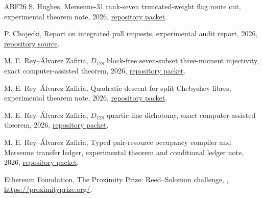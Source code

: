 \documentclass[11pt,a4paper]{amsart}
\numberwithin{equation}{section}
\theoremstyle{remark}
\begin{document}
\begin{thebibliography}{ABF26}
S. Hughes,
\newblock Mersenne-31 rank-seven truncated-weight flag route cut,
\newblock experimental theorem note, 2026,
\newblock \href{https://github.com/przchojecki/rs-mca/blob/5ecb9ab538a0a57dcb81018b17f32849049fb998/experimental/notes/thresholds/m31_rank7_truncated_weight_flag_route_cut_v1.md}{repository packet}.

P. Chojecki,
\newblock Report on integrated pull requests,
\newblock experimental audit report, 2026,
\newblock \href{https://github.com/przchojecki/rs-mca/blob/5ecb9ab538a0a57dcb81018b17f32849049fb998/experimental/PR-report-1.tex}{repository source}.

M. E. Rey--\'Alvarez Zafiria,
\newblock $D_{128}$ block-free seven-subset three-moment injectivity,
\newblock exact computer-assisted theorem, 2026,
\newblock \href{https://github.com/przchojecki/rs-mca/pull/1015}{repository packet}.

M. E. Rey--\'Alvarez Zafiria,
\newblock Quadratic descent for split Chebyshev fibres,
\newblock experimental theorem note, 2026,
\newblock \href{https://github.com/przchojecki/rs-mca/pull/1016}{repository packet}.

M. E. Rey--\'Alvarez Zafiria,
\newblock $D_{128}$ quartic-line dichotomy,
\newblock exact computer-assisted theorem, 2026,
\newblock \href{https://github.com/przchojecki/rs-mca/pull/1017}{repository packet}.

M. E. Rey--\'Alvarez Zafiria,
\newblock Typed pair-resource occupancy compiler and Mersenne transfer ledger,
\newblock experimental theorem and conditional ledger note, 2026,
\newblock \href{https://github.com/przchojecki/rs-mca/pull/1018}{repository packet}.

Ethereum Foundation,
\newblock The Proximity Prize: Reed--Solomon challenge,
, \url{https://proximityprize.org/}.

\end{thebibliography}
\end{document}
